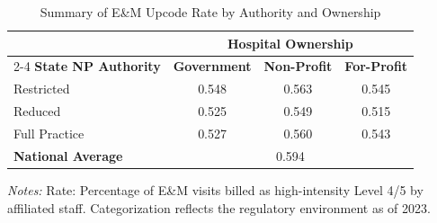 \begin{table}[htbp]
    \centering
    \caption{Summary of E\&M Upcode Rate by Authority and Ownership}
    \label{tab:partb_em_upcode_rate_own}
    \vspace{0.2cm}
    \begin{tabular}{lccc}
        \toprule
        & \multicolumn{3}{c}{\textbf{Hospital Ownership}} \\
        \cmidrule(lr){2-4}
        \textbf{State NP Authority} & \textbf{Government} & \textbf{Non-Profit} & \textbf{For-Profit} \\
        \midrule
        Restricted & 0.548 & 0.563 & 0.545 \\
        Reduced & 0.525 & 0.549 & 0.515 \\
        Full Practice & 0.527 & 0.560 & 0.543 \\
        \midrule
        \textbf{National Average} & \multicolumn{3}{c}{0.594} \\
        \bottomrule
    \end{tabular}
    \vspace{0.1cm}
    \begin{minipage}{0.85\textwidth}
        \footnotesize \textit{Notes:} Rate: Percentage of E\&M visits billed as high-intensity Level 4/5 by affiliated staff. Categorization reflects the regulatory environment as of 2023.
    \end{minipage}
\end{table}